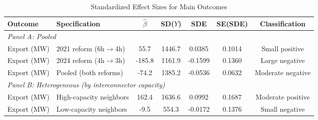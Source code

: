 \begin{table}[H]
\centering
\caption{Standardized Effect Sizes for Main Outcomes}
\label{tab:sde}
\begin{adjustbox}{max width=\textwidth}
\begin{tabular}{llccccc}
\toprule
Outcome & Specification & $\hat{\beta}$ & SD($Y$) & SDE & SE(SDE) & Classification \\
\midrule
\multicolumn{7}{l}{\textit{Panel A: Pooled}} \\
Export (MW) & 2021 reform (6h$\to$4h) & 55.7 & 1446.7 & 0.0385 & 0.1014 & Small positive \\
Export (MW) & 2024 reform (4h$\to$3h) & -185.8 & 1161.9 & -0.1599 & 0.1360 & Large negative \\
Export (MW) & Pooled (both reforms) & -74.2 & 1385.2 & -0.0536 & 0.0632 & Moderate negative \\
\midrule
\multicolumn{7}{l}{\textit{Panel B: Heterogeneous (by interconnector capacity)}} \\
Export (MW) & High-capacity neighbors & 162.4 & 1636.6 & 0.0992 & 0.1687 & Moderate positive \\
Export (MW) & Low-capacity neighbors & -9.5 & 554.3 & -0.0172 & 0.1376 & Small negative \\
\bottomrule
\end{tabular}
\end{adjustbox}
\par\vspace{0.5em}
\begin{minipage}{\textwidth}\sloppy

\end{minipage}
\end{table}
